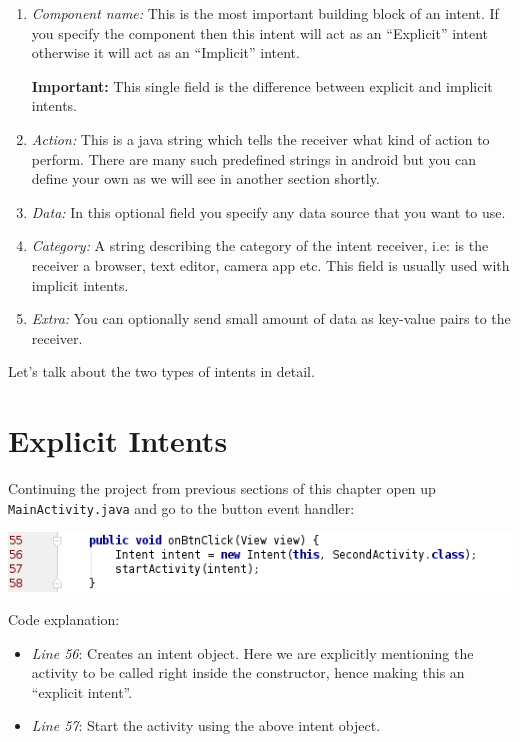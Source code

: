 \begin{enumerate}
	\item \textit{Component name:} This is the most important building block of an intent. If you specify the component then this intent will act as an ``Explicit'' intent otherwise it will act as an ``Implicit'' intent.
	
	\textbf{Important:} This single field is the difference between explicit and implicit intents.
	
	\item \textit{Action:} This is a java string which tells the receiver what kind of action to perform. There are many such predefined strings in android but you can define your own as we will see in another section shortly.
	
	\item \textit{Data:} In this optional field you specify any data source that you want to use.
	
	\item \textit{Category:} A string describing the category of the intent receiver, i.e: is the receiver a browser, text editor, camera app etc. This field is usually used with implicit intents.
	
	\item \textit{Extra:} You can optionally send small amount of data as key-value pairs to the receiver.
\end{enumerate}

Let's talk about the two types of intents in detail.

\section{Explicit Intents}
\label{ALI:explicitIntents}

Continuing the project from previous sections of this chapter open up \texttt{MainActivity.java} and go to the button event handler:

\begin{center}
	\includegraphics[scale=0.4]{chapters/ch08/images/8}
\end{center}

Code explanation:

\begin{itemize}
	\item \textit{Line 56}: Creates an intent object. Here we are explicitly mentioning the activity to be called right inside the constructor, hence making this an ``explicit intent''.
	
	\item \textit{Line 57}: Start the activity using the above intent object.
\end{itemize}

